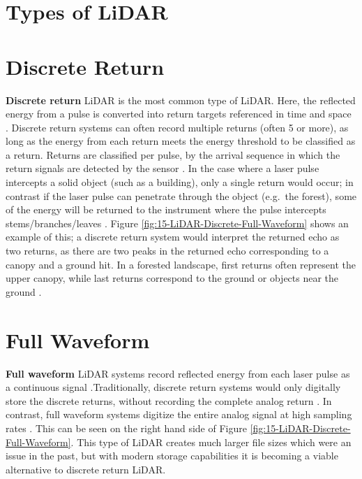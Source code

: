\documentclass[
]{book}
\begin{document}
\hypertarget{types-of-lidar}{%
\section{Types of LiDAR}\label{types-of-lidar}}

\hypertarget{discrete-return}{%
\section{Discrete Return}\label{discrete-return}}

\textbf{Discrete return} LiDAR is the most common type of LiDAR. Here, the reflected energy from a pulse is converted into return targets referenced in time and space \citep{white_best_2013}. Discrete return systems can often record multiple returns (often 5 or more), as long as the energy from each return meets the energy threshold to be classified as a return. Returns are classified per pulse, by the arrival sequence in which the return signals are detected by the sensor \citep{uf_geomatics_-_fort_lauderdale_lidar_2016}. In the case where a laser pulse intercepts a solid object (such as a building), only a single return would occur; in contrast if the laser pulse can penetrate through the object (e.g.~the forest), some of the energy will be returned to the instrument where the pulse intercepts stems/branches/leaves \citep{white_best_2013}. Figure \ref{fig:15-LiDAR-Discrete-Full-Waveform} shows an example of this; a discrete return system would interpret the returned echo as two returns, as there are two peaks in the returned echo corresponding to a canopy and a ground hit. In a forested landscape, first returns often represent the upper canopy, while last returns correspond to the ground or objects near the ground \citep{white_best_2013}.

\hypertarget{full-waveform}{%
\section{Full Waveform}\label{full-waveform}}

\textbf{Full waveform} LiDAR systems record reflected energy from each laser pulse as a continuous signal \citep{white_best_2013}.Traditionally, discrete return systems would only digitally store the discrete returns, without recording the complete analog return \citep{uf_geomatics_-_fort_lauderdale_lidar_2016}. In contrast, full waveform systems digitize the entire analog signal at high sampling rates \citep{uf_geomatics_-_fort_lauderdale_lidar_2016}. This can be seen on the right hand side of Figure \ref{fig:15-LiDAR-Discrete-Full-Waveform}. This type of LiDAR creates much larger file sizes which were an issue in the past, but with modern storage capabilities it is becoming a viable alternative to discrete return LiDAR.
\end{document}
